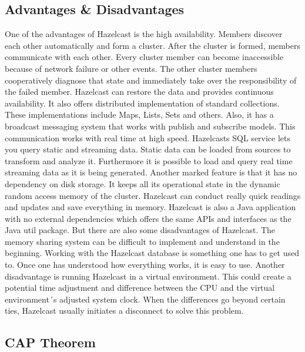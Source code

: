 \subsection{Advantages \& Disadvantages} \label{subsec:advantagesDisadvantagesHazelcast}

One of the advantages of Hazelcast is the high availability. Members discover each other automatically and form a cluster. 
After the cluster is formed, members communicate with each other.  Every cluster member can become inaccessible because of network 
failure or other events. The other cluster members cooperatively diagnose that state and immediately take over the responsibility of the failed member. Hazelcast can restore the data and provides continuous availability. 
It also offers distributed implementation of standard collections. These implementations include Maps, Lists, Sets and others. Also, 
it has a broadcast messaging system that works with publish and subscribe models. This communication works with real time at high speed. 
Hazelcasts SQL service lets you query static and streaming data. Static data can be loaded from sources to transform and analyze it. 
Furthermore it is possible to load and query real time streaming data as it is being generated.
Another marked feature is that it has no dependency on disk storage. It keeps all its operational state in the dynamic random access 
memory of the cluster. Hazelcast can conduct really quick readings and updates and save everything in memory.
Hazelcast is also a Java application with no external dependencies which offers the same APIs and interfaces as the Java util package. 
But there are also some disadvantages of Hazelcast. The memory sharing system can be difficult to implement and understand in the 
beginning. Working with the Hazelcast database is something one has to get used to. Once one has understood how everything works, it is easy to use. 
Another disadvantage is running Hazelcast in a virtual environment. This could create a potential time adjustment and difference 
between the CPU and the virtual environment´s adjusted system clock. When the differences go beyond certain ties, Hazelcast usually 
initiates a disconnect to solve this problem. \parencite{Oguejiofor.05.10.2022}

\subsection{CAP Theorem} \label{subsec:capTheoremHazelcast}

